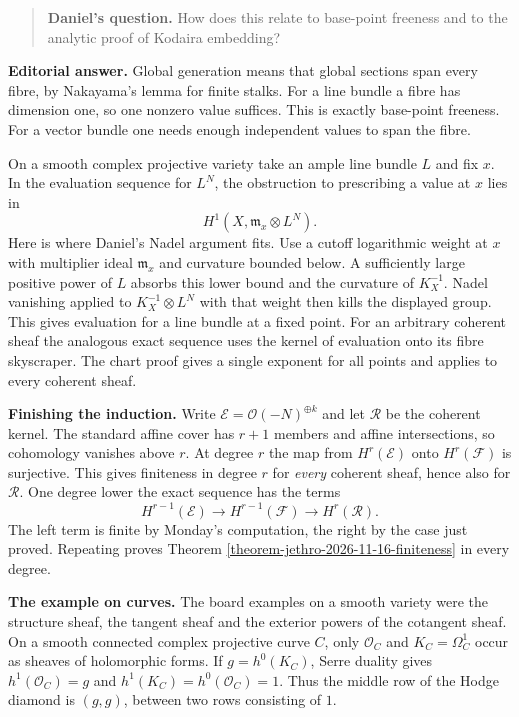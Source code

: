 \begin{quote}
\textbf{Daniel's question.}
How does this relate to base-point freeness
and to the analytic proof of Kodaira
embedding?
\end{quote}
\textbf{Editorial answer.}
Global generation means that global sections
span every fibre, by Nakayama's lemma for
finite stalks. For a line bundle a fibre has
dimension one, so one nonzero value suffices.
This is exactly base-point freeness. For a
vector bundle one needs enough independent
values to span the fibre.

On a smooth complex projective variety take
an ample line bundle $L$ and fix $x$. In the
evaluation sequence for $L^N$, the
obstruction to prescribing a value at $x$
lies in
$$
H^1(X,\mathfrak m_x\otimes L^N).
$$
Here is where Daniel's Nadel argument fits.
Use a cutoff logarithmic weight at $x$ with
multiplier ideal $\mathfrak m_x$ and
curvature bounded below. A sufficiently large
positive power of $L$ absorbs this lower
bound and the curvature of $K_X^{-1}$. Nadel
vanishing applied to $K_X^{-1}\otimes L^N$
with that weight then kills the displayed
group. This gives evaluation for a line
bundle at a fixed point. For an arbitrary
coherent sheaf the analogous exact sequence
uses the kernel of evaluation onto its fibre
skyscraper. The chart proof gives a single
exponent for all points and applies to every
coherent sheaf.

\medskip\noindent
\textbf{Finishing the induction.}
Write $\mathcal E=\mathcal O(-N)^{\oplus k}$
and let $\mathcal R$ be the coherent kernel.
The standard affine cover has $r+1$ members
and affine intersections, so cohomology
vanishes above $r$. At degree $r$ the map
from $H^r(\mathcal E)$ onto $H^r(\mathcal F)$
is surjective. This gives finiteness in
degree $r$ for \emph{every} coherent sheaf,
hence also for $\mathcal R$. One degree lower
the exact sequence has the terms
$$
H^{r-1}(\mathcal E)\longrightarrow
H^{r-1}(\mathcal F)\longrightarrow
H^r(\mathcal R).
$$
The left term is finite by Monday's
computation, the right by the case just
proved. Repeating proves Theorem
\ref{theorem-jethro-2026-11-16-finiteness}
in every degree.

\medskip\noindent
\textbf{The example on curves.}
The board examples on a smooth variety were
the structure sheaf, the tangent sheaf and
the exterior powers of the cotangent sheaf.
On a smooth connected complex projective
curve $C$, only $\mathcal O_C$ and
$K_C=\Omega_C^1$ occur as sheaves of
holomorphic forms. If $g=h^0(K_C)$, Serre
duality gives $h^1(\mathcal O_C)=g$ and
$h^1(K_C)=h^0(\mathcal O_C)=1$. Thus the
middle row of the Hodge diamond is $(g,g)$,
between two rows consisting of $1$.

